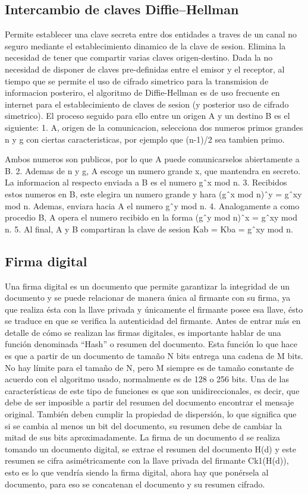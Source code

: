 \subsection{Intercambio de claves Diffie–Hellman}\label{sec:diffie_hellman}
Permite establecer una clave secreta entre dos entidades a traves de un canal no
seguro mediante el establecimiento dinamico de la clave de sesion.
Elimina la necesidad de tener que compartir varias claves origen-destino. Dada
la no necesidad de disponer de claves pre-definidas entre el emisor y el receptor,
al tiempo que se permite el uso de cifrado simetrico para la transmision de
informacion posteriro, el algoritmo de Diffie-Hellman es de uso frecuente en
internet para el establecimiento de claves de sesion (y posterior uso de cifrado
simetrico). El proceso seguido para ello entre un origen A y un destino B es el
siguiente: 1. A, origen de la comunicacion, selecciona dos numeros primos grandes
n y g con ciertas caracteristicas, por ejemplo que (n-1)/2 sea tambien primo.

Ambos numeros son publicos, por lo que A puede comunicarselos abiertamente a
B. 2. Ademas de n y g, A escoge un numero grande x, que mantendra en secreto.
La informacion al respecto enviada a B es el numero gˆx mod n. 3. Recibidos
estos numeros en B, este elegira un numero grande y hara (gˆx mod n)ˆy =
gˆxy mod n. Ademas, enviara hacia A el numero gˆy mod n. 4. Analogamente
a como procedio B, A opera el numero recibido en la forma (gˆy mod n)ˆx =
gˆxy mod n. 5. Al final, A y B compartiran la clave de sesion Kab = Kba =
gˆxy mod n.
\subsection{Firma digital}
Una firma digital es un documento que permite garantizar la integridad de un documento y se puede
relacionar de manera única al firmante con su firma, ya que realiza ésta con la llave privada y únicamente
el firmante posee esa llave, ésto se traduce en que se verifica la autenticidad del firmante.
Antes de entrar más en detalle de cómo se realizan las firmas digitales, es importante hablar de una
función denominada “Hash” o resumen del documento. Esta función lo que hace es que a partir de un
documento de tamaño N bits entrega una cadena de M bits. No hay límite para el tamaño de N, pero M
siempre es de tamaño constante de acuerdo con el algoritmo usado, normalmente es de 128 o 256 bits.
Una de las características de este tipo de funciones es que son unidireccionales, es decir, que debe de
ser imposible a partir del resumen del documento encontrar el mensaje original. También deben cumplir
la propiedad de dispersión, lo que significa que si se cambia al menos un bit del documento, su resumen
debe de cambiar la mitad de sus bits aproximadamente.
La firma de un documento d se realiza tomando un documento digital, se extrae el resumen del
documento H(d) y este resumen se cifra asimétricamente con la llave privada del firmante Ck1(H(d)), esto
es lo que vendría siendo la firma digital, ahora hay que ponérsela al documento, para eso se concatenan
el documento y su resumen cifrado.

